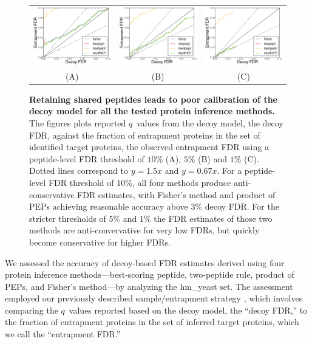 \documentclass{article}
\begin{document}
\begin{figure}
\begin{center}
\begin{tabular}{ccc} 
\includegraphics[width=0.3\linewidth]
  {./img/shared-pept-accuracy-fdr10} &
\includegraphics[width=0.3\linewidth]
  {./img/shared-pept-accuracy-fdr5} & 
\includegraphics[width=0.3\linewidth]
  {./img/shared-pept-accuracy-fdr1}\\
(A) & (B) & (C)
\end{tabular}
\caption{\label{fig:shared-accuracy}\textbf{Retaining shared peptides
leads to poor calibration of the decoy model for all the tested
protein inference methods.} The figures plots reported $q$~values from
the decoy model, the decoy FDR, against the fraction of entrapment
proteins in the set of identified target proteins, the observed
entrapment FDR using a peptide-level FDR threshold of $10\%$ (A),
$5\%$ (B) and $1\%$ (C). Dotted lines correspond to $y=1.5x$ and
$y=0.67x$.  For a peptide-level FDR threshold of $10\%$, all four
methods produce anti-conservative FDR estimates, with Fisher's method
and product of PEPs achieving reasonable accuracy above $3\%$ decoy
FDR. For the stricter thresholds of $5\%$ and $1\%$ the FDR estimates
of those two methods are anti-convervative for very low FDRs, but
quickly become conservative for higher FDRs.}
\end{center}
\end{figure}

We assessed the accuracy of decoy-based FDR estimates derived using
four protein inference methods---best-scoring peptide, two-peptide
rule, product of PEPs, and Fisher's method---by analyzing the
hm\_yeast set.  The assessment employed our previously described
sample/entrapment strategy \cite{granholm2013determining}, which
involves comparing the $q$~values reported based on the decoy model,
the ``decoy FDR,'' to the fraction of entrapment proteins in the set
of inferred target proteins, which we call the ``entrapment FDR.''
\end{document}
